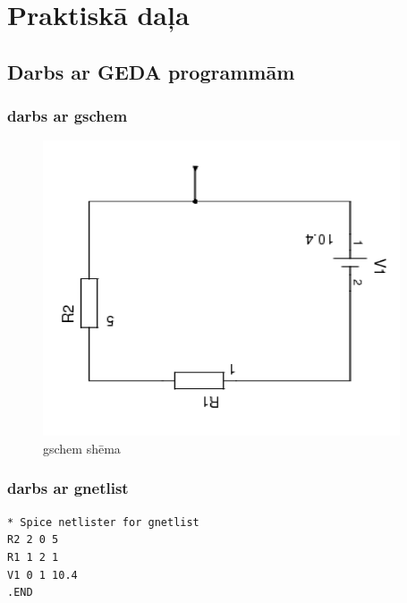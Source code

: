 \documentclass{report}
\begin{document}
\chapter{Praktiskā daļa}
\section{Darbs ar GEDA programmām}
\subsection{darbs ar gschem}

    \begin{figure}[!htb]
    \centering
        \includegraphics[scale=0.6, angle=180]{1sch}
        \caption{gschem shēma}
        \label{fig:my_label}
    \end{figure} \newpage



\subsection{darbs ar gnetlist}

\begin{verbatim}
* Spice netlister for gnetlist
R2 2 0 5
R1 1 2 1
V1 0 1 10.4
.END

\end{verbatim}
\end{document}
